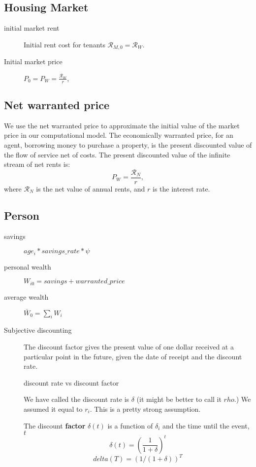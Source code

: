 \subsection{Housing Market}
\begin{description}
\item [initial market rent] 
Initial rent cost for tenants  $\mathcal{R}_{M, 0}= \mathcal{R}_W$.

\item [Initial market price] 
$P_0= P_W=\frac{\mathcal{R}_W }{r}$,  
\end{description}


\subsection{Net warranted price} \label{section-warranted-price}
We use the net warranted price to approximate the initial value of the market price in our computational model. 
The economically \gls{warranted price}, for an agent, borrowing money to purchase a property, is the present discounted value of the flow of service net of costs. The present discounted value of the infinite stream of net rents is:
\begin{equation}
P_W=\frac{\mathcal{R}_N}{r},  
\label{eqn-price-warranted}
\end{equation}
where $\mathcal{R}_N$ is the net value of annual rents, and $r$ is the interest rate.  


\subsection{Person}
\begin{description}
\item[savings] $age_i*savings\_rate*\psi$
\item[personal wealth] $W_{i0}= savings + warranted\_price $
\item[average wealth] $\bar W_{0}= \sum_i W_i$
\item[Subjective discounting] The discount factor gives the present value of one dollar received at a particular point in the future, given the date of receipt and the discount rate.

{discount rate vs discount factor}

We have called the  discount rate is $\delta$ (it might be better to call it $rho$.) We assumed it equal to $r_i$. This is a pretty strong assumption.

The discount \textbf{factor} $\delta(t)$ is a function of $\delta_i$ and the time until the event, $t$
\[\delta(t)=\left(\frac{1}{1+\delta}\right)^t\]
\[delta(T)=  (1/(1+\delta))^T\]   

\end{description}



